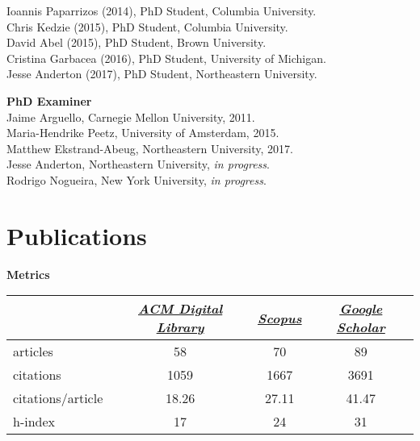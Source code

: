 \documentclass{article}
\begin{document}
\vspace{\baselineskip}

\noindent Ioannis Paparrizos (2014), PhD Student, Columbia University.\\
Chris Kedzie (2015), PhD Student,  Columbia University.\\
David Abel (2015), PhD Student, Brown University.\\
Cristina Garbacea (2016), PhD Student, University of Michigan.\\
Jesse Anderton (2017), PhD Student,  Northeastern University.
	
\vspace{\baselineskip}
\noindent\textbf{PhD Examiner}\\
Jaime Arguello, Carnegie Mellon University, 2011.\\
Maria-Hendrike Peetz, University of Amsterdam, 2015.\\
Matthew Ekstrand-Abeug, Northeastern University, 2017.\\
Jesse Anderton, Northeastern University, \emph{in progress}.\\
Rodrigo Nogueira, New York University, \emph{in progress}.

\setlength{\leftmargini}{0em}
 \section{Publications}\noindent\textbf{Metrics}\\
\noindent\begin{center}\begin{tabular}{lccc}
&\href{http://dl.acm.org/author\_page.cfm?id=81551748956}{\textit{ACM Digital Library}}&\href{https://www.scopus.com/authid/detail.uri?authorId=55605195900}{\textit{Scopus}}&\href{http://scholar.google.com/citations?user=212SLn0AAAAJ}{\textit{Google Scholar}}\\
\hline
articles&58&70&89\\
citations&1059&1667&3691\\
citations/article&18.26&27.11&41.47\\
h-index&17&24&31
\end{tabular}
\end{center}
\end{document}
